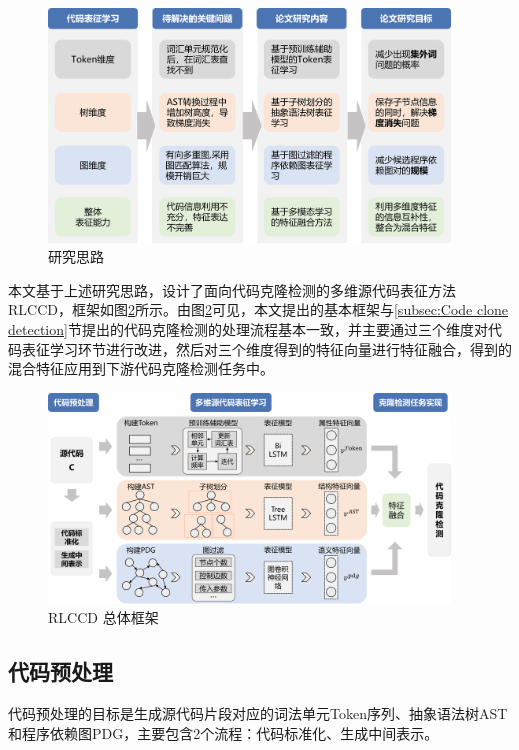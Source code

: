 \begin{figure}[H]
    \centering
    \includegraphics[width=0.95\textwidth]{figures/thinking}
    \caption{研究思路}\label{fig:thinking}
\end{figure}



本文基于上述研究思路，设计了面向代码克隆检测的多维源代码表征方法RLCCD，框架如图\ref{fig:framework}所示。由图\ref{fig:framework}可见，本文提出的基本框架与\ref{subsec:Code clone detection}节提出的代码克隆检测的处理流程基本一致，并主要通过三个维度对代码表征学习环节进行改进，然后对三个维度得到的特征向量进行特征融合，得到的混合特征应用到下游代码克隆检测任务中。

\begin{figure}[H]
    \centering
    \includegraphics[width=0.95\textwidth]{figures/framework}
    \caption{RLCCD 总体框架}
    \label{fig:framework}
\end{figure}

\subsection{代码预处理}
\label{subsec:Preprocess}
代码预处理的目标是生成源代码片段对应的词法单元Token序列、抽象语法树AST和程序依赖图PDG，主要包含2个流程：代码标准化、生成中间表示。

